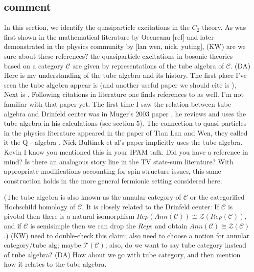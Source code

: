 \documentclass[12pt,a4paper]{article}
\newcommand{\mcz}{\mathcal{Z}}
\newcommand{\mct}{\mathcal{T}}
\newcommand{\mcc}{\mathcal{C}}
\newcommand{\kw}[1]{{\color{kwcolor}\footnotesize{(KW) #1}}}
\newcommand{\dave}[1]{{\color{ao(english)}\footnotesize{(DA) #1}}}
\begin{document}
\subsection{comment}
In this section, we identify the quasiparticle excitations in the $C_2$ theory. 
As was first shown in the mathematical literature by Occneanu [ref] and later demonstrated in 
the physics community by [lan wen, nick, yuting], 
\kw{are we sure about these references?}
the quasiparticle excitations in bosonic theories 
based on a category $\mcc$ are given by 
representations of the tube algebra of $\mcc$.
\dave{Here is my understanding of the tube algebra and its history.
The first place I've seen the tube algebra appear is \cite{ocneanu1994} 
(and another useful paper we should cite is \cite{ocneanu2001}), 
Next is \cite{evans1995}.
Following citations in literature one finds references to \cite{Izumi2000} as well. 
I'm not familiar with that paper yet.
The first time I saw the relation between tube algebra and Drinfeld center was in Muger's 2003 paper \cite{muger2003b}, he reviews and uses the tube algebra in his calculations (see section 5). 
The connection to quasi particles in the physics literature appeared in the paper of Tian Lan and Wen, they called it the Q - algebra \cite{Lan2014}. 
Nick Bultinck et al's paper \cite{Bultinck2017} implicitly uses the tube algebra.
Kevin I know you mentioned this in your IPAM talk. 
Did you have a reference in mind?
Is there an analogous story line in the TV state-sum literature?
}
With appropriate modifications accounting for spin structure issues, this same construction holds 
in the more general fermionic setting considered here. 



(The tube algebra is also known as the annular category of $\mcc$
or the categorified Hochschild homology of $\mcc$.
It is closely related to the Drinfeld center:
If $\mcc$ is pivotal then there is a natural isomorphism
$Rep(Ann(\mcc)) \cong \mcz(Rep(\mcc))$, and if $\mcc$ is semisimple then we can drop
the $Rep$s and obtain $Ann(\mcc) \cong \mcz(\mcc)$.)
\kw{need to double-check this claim; also need to choose a notion for annular category/tube alg;
maybe $\mct(\mcc)$; also, do we want to say tube category instead of tube algebra?}
\dave{How about we go with tube category, and then mention how it relates to the tube algebra. 
}
\end{document}
